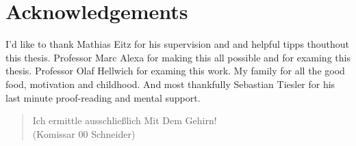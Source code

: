 
\chapter*{Acknowledgements}
\thispagestyle{empty}

I'd like to thank Mathias Eitz for his supervision and and helpful tipps
thouthout this thesis. Professor Marc Alexa for making this all possible
and for examing this thesis. Professor Olaf Hellwich for examing this work. My
family for all the good food, motivation and childhood.
And most thankfully Sebastian Tiesler for his last minute proof-reading and
mental support.

\begin{quotation}
 Ich ermittle ausschließlich Mit Dem Gehirn!\\
(Komissar 00 Schneider)
\end{quotation}


